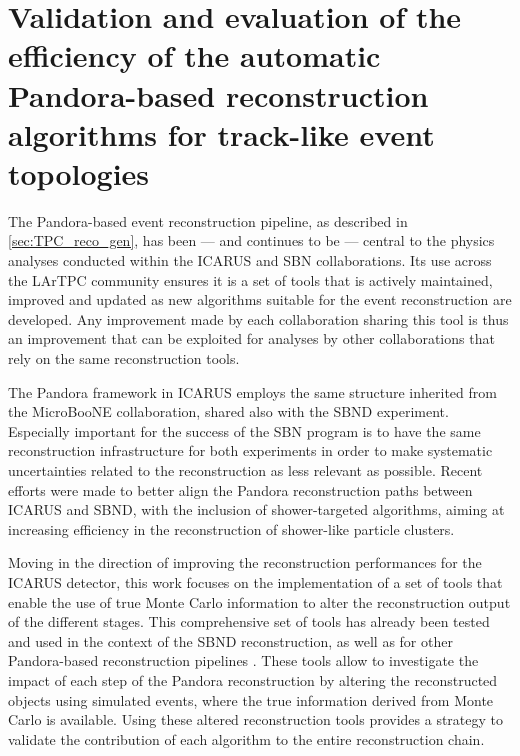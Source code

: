 
\chapter[Validating and evaluating the efficiency of Pandora reconstruction]{Validation and evaluation of the efficiency of the automatic Pandora-based reconstruction algorithms for track-like event topologies}\label{chap:methods}

The Pandora-based event reconstruction pipeline, as described in \autoref{sec:TPC_reco_gen}, has been --- and continues to be --- central to the physics analyses conducted within the ICARUS and SBN collaborations. Its use across the LArTPC community ensures it is a set of tools that is actively maintained, improved and updated as new algorithms suitable for the event reconstruction are developed. Any improvement made by each collaboration sharing this tool is thus an improvement that can be exploited for analyses by other collaborations that rely on the same reconstruction tools.

The Pandora framework in ICARUS employs the same structure inherited from the MicroBooNE collaboration, shared also with the SBND experiment. Especially important for the success of the SBN program is to have the same reconstruction infrastructure for both experiments in order to make systematic uncertainties related to the reconstruction as less relevant as possible.  Recent efforts were made to better align the Pandora reconstruction paths between ICARUS and SBND, with the inclusion of shower-targeted algorithms, aiming at increasing efficiency in the reconstruction of shower-like particle clusters. 

Moving in the direction of improving the reconstruction performances for the ICARUS detector, this work focuses on the implementation of a set of tools that enable the use of true Monte Carlo information to alter the reconstruction output of the different stages. This comprehensive set of tools has already been tested and used in the context of the SBND reconstruction, as well as for other Pandora-based reconstruction pipelines \cite{Mawby:2023nws, Nguyen:2023_cheatingPandora}. These tools allow to investigate the impact of each step of the Pandora reconstruction by altering the reconstructed objects using simulated events, where the true information derived from Monte Carlo is available. Using these altered reconstruction tools provides a strategy to validate the contribution of each algorithm to the entire reconstruction chain. 

